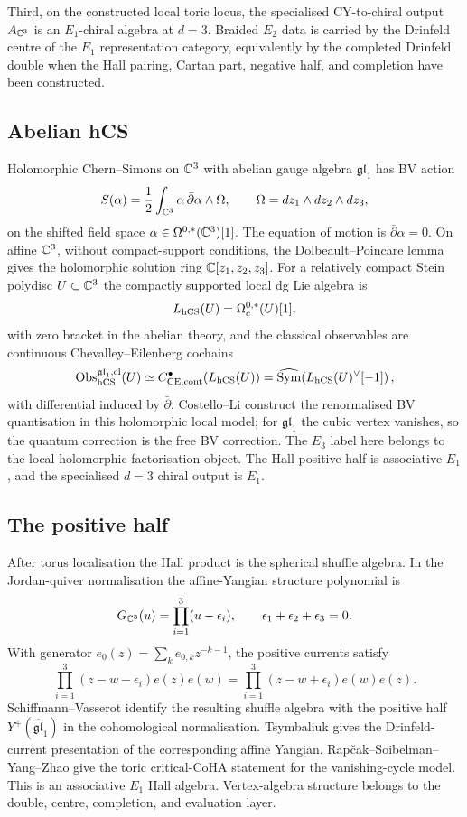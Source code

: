 Third, on the constructed local toric locus, the specialised
CY-to-chiral output $A_{\mathbb{C}^3}$ is an $E_1$-chiral algebra at $d=3$.
Braided $E_2$ data is carried by the Drinfeld centre of the $E_1$
representation category, equivalently by the completed Drinfeld double
when the Hall pairing, Cartan part, negative half, and completion have
been constructed.

\subsection*{Abelian hCS}

Holomorphic Chern--Simons on $\mathbb{C}^3$ with abelian gauge algebra
$\mathfrak{gl}_1$ has BV action
\[
  S(\alpha)=\frac{1}{2}\int_{\mathbb{C}^3}\alpha\,\bar\partial\alpha\wedge\Omega,
  \qquad
  \Omega=dz_1\wedge dz_2\wedge dz_3,
\]
on the shifted field space
$\alpha\in\Omega^{0,\ast}(\mathbb{C}^3)[1]$. The equation of motion is
$\bar\partial\alpha=0$. On affine $\mathbb{C}^3$, without compact-support
conditions, the Dolbeault--Poincare lemma gives the holomorphic
solution ring $\mathbb{C}[z_1,z_2,z_3]$. For a relatively compact Stein polydisc
$U\subset \mathbb{C}^3$ the compactly supported local dg Lie algebra is
\[
  L_{\mathrm{hCS}}(U)=\Omega^{0,\ast}_c(U)[1],
\]
with zero bracket in the abelian theory, and the classical observables
are continuous Chevalley--Eilenberg cochains
\[
  \mathrm{Obs}_{\mathrm{hCS}}^{\mathfrak{gl}_1,\mathrm{cl}}(U)
  \simeq
  C^\bullet_{\mathrm{CE},\mathrm{cont}}\!\left(L_{\mathrm{hCS}}(U)\right)
  =
  \widehat{\operatorname{Sym}}\!\left(L_{\mathrm{hCS}}(U)^\vee[-1]\right),
\]
with differential induced by $\bar\partial$. Costello--Li construct the
renormalised BV quantisation in this holomorphic local model; for
$\mathfrak{gl}_1$ the cubic vertex vanishes, so the quantum correction is
the free BV correction. The $E_3$ label here belongs to the local
holomorphic factorisation object. The Hall positive half is associative
$E_1$, and the specialised $d=3$ chiral output is $E_1$.

\subsection*{The positive half}

After torus localisation the Hall product is the spherical shuffle
algebra. In the Jordan-quiver normalisation the affine-Yangian structure
polynomial is
\[
  G_{\mathbb{C}^3}(u)=
  \prod_{i=1}^{3}(u-\epsilon_i),
  \qquad
  \epsilon_1+\epsilon_2+\epsilon_3=0.
\]
With generator $e_0(z)=\sum_k e_{0,k}z^{-k-1}$, the positive currents
satisfy
\[
  \prod_{i=1}^{3}(z-w-\epsilon_i)e(z)e(w)
  =
  \prod_{i=1}^{3}(z-w+\epsilon_i)e(w)e(z).
\]
Schiffmann--Vasserot identify the resulting shuffle algebra with the
positive half $Y^+(\widehat{\mathfrak{gl}}_1)$ in the cohomological
normalisation. Tsymbaliuk gives the Drinfeld-current presentation of
the corresponding affine Yangian. Rap\v{c}ak--Soibelman--Yang--Zhao give
the toric critical-CoHA statement for the vanishing-cycle model. This is
an associative $E_1$ Hall algebra. Vertex-algebra structure belongs to
the double, centre, completion, and evaluation layer.

